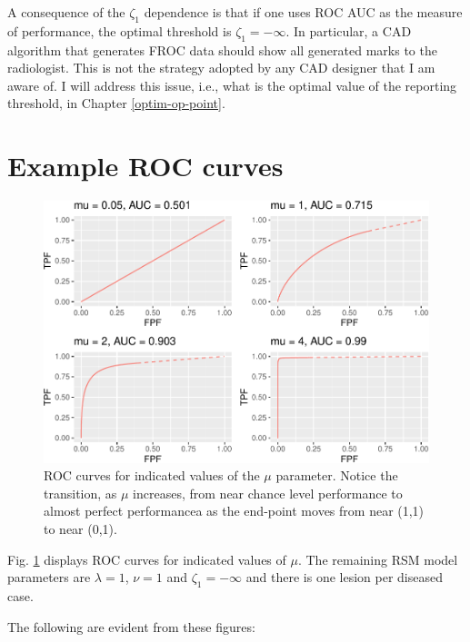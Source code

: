 \documentclass[
]{book}
\begin{document}
A consequence of the \(\zeta_1\) dependence is that if one uses ROC AUC as the measure of performance, the optimal threshold is \(\zeta_1 = -\infty\). In particular, a CAD algorithm that generates FROC data should show all generated marks to the radiologist. This is not the strategy adopted by any CAD designer that I am aware of. I will address this issue, i.e., what is the optimal value of the reporting threshold, in Chapter \ref{optim-op-point}.

\hypertarget{rsm-pred-roc-curves}{%
\section{Example ROC curves}\label{rsm-pred-roc-curves}}

\begin{figure}
\centering
\includegraphics{17a-rsm-predictions_files/figure-latex/rsm-pred-fig-auc-mu-plots-1.pdf}
\caption{\label{fig:rsm-pred-fig-auc-mu-plots}ROC curves for indicated values of the \(\mu\) parameter. Notice the transition, as \(\mu\) increases, from near chance level performance to almost perfect performancea as the end-point moves from near (1,1) to near (0,1).}
\end{figure}

Fig. \ref{fig:rsm-pred-fig-auc-mu-plots} displays ROC curves for indicated values of \(\mu\). The remaining RSM model parameters are \(\lambda = 1\), \(\nu = 1\) and \(\zeta_1 = -\infty\) and there is one lesion per diseased case.

The following are evident from these figures:
\end{document}

